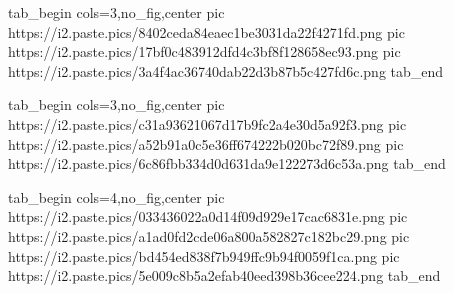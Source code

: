  
 
 
 
 
\zzSecCmtScr

\ifcmt
  tab_begin cols=3,no_fig,center
     pic https://i2.paste.pics/8402ceda84eaec1be3031da22f4271fd.png
		 pic https://i2.paste.pics/17bf0c483912dfd4c3bf8f128658ec93.png
		 pic https://i2.paste.pics/3a4f4ac36740dab22d3b87b5c427fd6c.png
  tab_end
\fi

\ifcmt
  tab_begin cols=3,no_fig,center
		 pic https://i2.paste.pics/c31a93621067d17b9fc2a4e30d5a92f3.png
		 pic https://i2.paste.pics/a52b91a0c5e36ff674222b020bc72f89.png
		 pic https://i2.paste.pics/6c86fbb334d0d631da9e122273d6c53a.png
  tab_end
\fi

\ifcmt
  tab_begin cols=4,no_fig,center
		 pic https://i2.paste.pics/033436022a0d14f09d929e17cac6831e.png
		 pic https://i2.paste.pics/a1ad0fd2cde06a800a582827c182bc29.png
		 pic https://i2.paste.pics/bd454ed838f7b949ffc9b94f0059f1ca.png
		 pic https://i2.paste.pics/5e009c8b5a2efab40eed398b36cee224.png
  tab_end
\fi
